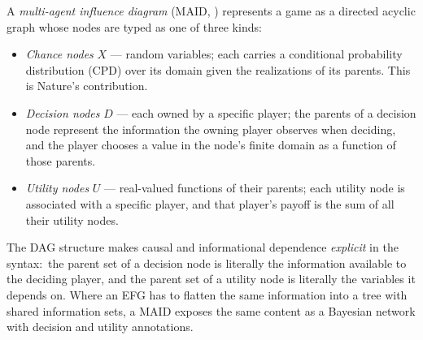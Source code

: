 A \emph{multi-agent influence diagram} (MAID,
\citealp{KollerMilch2003}) represents a game as a directed acyclic
graph whose nodes are typed as one of three kinds:
\begin{itemize}\itemsep2pt
\item \emph{Chance nodes} $X$ — random variables; each carries a
  conditional probability distribution (CPD) over its domain given
  the realizations of its parents.  This is Nature's contribution.
\item \emph{Decision nodes} $D$ — each owned by a specific player;
  the parents of a decision node represent the information the
  owning player observes when deciding, and the player chooses a
  value in the node's finite domain as a function of those
  parents.
\item \emph{Utility nodes} $U$ — real-valued functions of their
  parents; each utility node is associated with a specific player,
  and that player's payoff is the sum of all their utility nodes.
\end{itemize}

\noindent
The DAG structure makes causal and informational dependence
\emph{explicit} in the syntax:\ the parent set of a decision node
is literally the information available to the deciding player, and
the parent set of a utility node is literally the variables it
depends on.  Where an EFG has to flatten the same information into
a tree with shared information sets, a MAID exposes the same
content as a Bayesian network with decision and utility annotations.

\begin{center}
\end{center}

